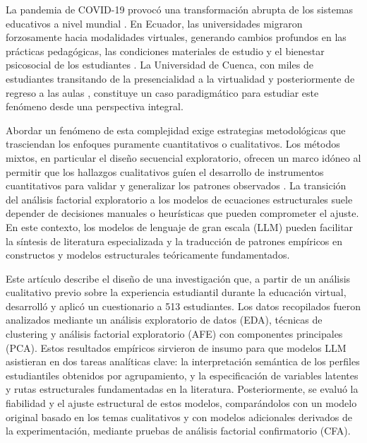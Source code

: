 \documentclass[conference]{IEEEtran}
\begin{document}
La pandemia de COVID-19 provocó una transformación abrupta de los sistemas educativos a nivel mundial \cite{unesco2021covid}. En Ecuador, las universidades migraron forzosamente hacia modalidades virtuales, generando cambios profundos en las prácticas pedagógicas, las condiciones materiales de estudio y el bienestar psicosocial de los estudiantes \cite{castillosanchezEducacionVirtualImplementada2021}. La Universidad de Cuenca, con miles de estudiantes transitando de la presencialidad a la virtualidad y posteriormente de regreso a las aulas \cite{eluniverso2021retornoUCuenca}, constituye un caso paradigmático para estudiar este fenómeno desde una perspectiva integral.

Abordar un fenómeno de esta complejidad exige estrategias metodológicas que trasciendan los enfoques puramente cuantitativos o cualitativos. Los métodos mixtos, en particular el diseño secuencial exploratorio, ofrecen un marco idóneo al permitir que los hallazgos cualitativos guíen el desarrollo de instrumentos cuantitativos para validar y generalizar los patrones observados \cite{creswellDesigningConductingMixed}. La transición del análisis factorial exploratorio a los modelos de ecuaciones estructurales suele depender de decisiones manuales o heurísticas que pueden comprometer el ajuste. En este contexto, los modelos de lenguaje de gran escala (LLM) pueden facilitar la síntesis de literatura especializada y la traducción de patrones empíricos en constructos y modelos estructurales teóricamente fundamentados.

Este artículo describe el diseño de una investigación que, a partir de un análisis cualitativo previo sobre la experiencia estudiantil durante la educación virtual, desarrolló y aplicó un cuestionario a 513 estudiantes. Los datos recopilados fueron analizados mediante un análisis exploratorio de datos (EDA), técnicas de clustering y análisis factorial exploratorio (AFE) con componentes principales (PCA). Estos resultados empíricos sirvieron de insumo para que modelos LLM asistieran en dos tareas analíticas clave: la interpretación semántica de los perfiles estudiantiles obtenidos por agrupamiento, y la especificación de variables latentes y rutas estructurales fundamentadas en la literatura. Posteriormente, se evaluó la fiabilidad y el ajuste estructural de estos modelos, comparándolos con un modelo original basado en los temas cualitativos y con modelos adicionales derivados de la experimentación, mediante pruebas de análisis factorial confirmatorio (CFA).
\end{document}
